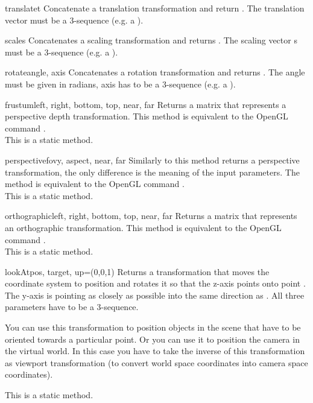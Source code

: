 \begin{methoddesc}{translate}{t}
Concatenate a translation transformation and return . The
translation vector  must be a 3-sequence (e.g. a ).
\end{methoddesc}

\begin{methoddesc}{scale}{s}
Concatenates a scaling transformation and returns . The scaling
vector s must be a 3-sequence (e.g. a ).
\end{methoddesc}

\begin{methoddesc}{rotate}{angle, axis}
Concatenates a rotation transformation and returns . The angle
must be given in radians, axis has to be a 3-sequence (e.g. a ).
\end{methoddesc}

\begin{methoddesc}{frustum}{left, right, bottom, top, near, far}
Returns a matrix that represents a perspective depth
transformation. This method is equivalent to the OpenGL command
.\\
This is a static method. 

\end{methoddesc}

\begin{methoddesc}{perspective}{fovy, aspect, near, far}
Similarly to  this method returns a perspective
transformation, the only difference is the meaning of the input
parameters. The method is equivalent to the OpenGL command
.\\
This is a static method. 
\end{methoddesc}

\begin{methoddesc}{orthographic}{left, right, bottom, top, near, far}
Returns a matrix that represents an orthographic transformation. This
method is equivalent to the OpenGL command .\\
This is a static method. 
\end{methoddesc}

\begin{methoddesc}{lookAt}{pos, target, up=(0,0,1)}
Returns a transformation that moves the coordinate system to position
 and rotates it so that the z-axis points onto point
. The y-axis is pointing as closely as possible into the
same direction as . All three parameters have to be a
3-sequence.

You can use this transformation to position objects in the scene that
have to be oriented towards a particular point. Or you can use it to
position the camera in the virtual world. In this case you have to
take the inverse of this transformation as viewport transformation (to
convert world space coordinates into camera space coordinates).

This is a static method. 
\end{methoddesc}

